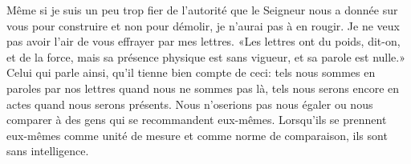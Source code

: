 Même si je suis un peu trop fier
		de l’autorité que le Seigneur nous a donnée sur vous
		pour construire et non pour démolir,
	je n’aurai pas à en rougir.
Je ne veux pas avoir l’air de vous effrayer par mes lettres.
«Les lettres ont du poids, dit-on, et de la force,
	mais sa présence physique est sans vigueur, et sa parole est nulle.»
Celui qui parle ainsi, qu’il tienne bien compte de ceci:
	tels nous sommes en paroles par nos lettres quand nous ne sommes pas là,
	tels nous serons encore en actes quand nous serons présents.
Nous n’oserions pas nous égaler
		ou nous comparer à des gens qui se recommandent eux-mêmes.
Lorsqu’ils se prennent eux-mêmes comme unité de mesure
		et comme norme de comparaison,
	ils sont sans intelligence.